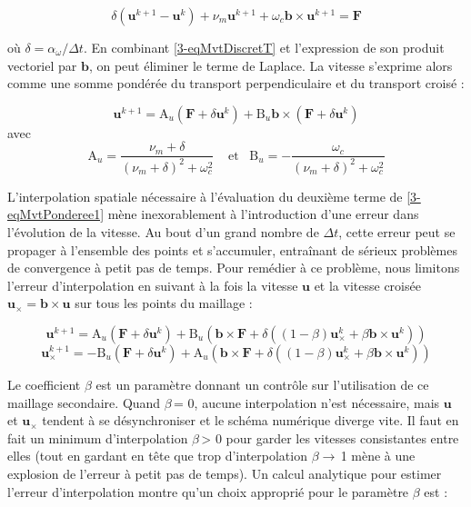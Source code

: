 \begin{refsection}
\begin{equation}
\label{3-eqMvtDiscretT}
\delta\left(\mathbf{u}^{k+1}-\mathbf{u}^{k}\right) + 
\nu_m\mathbf{u}^{k+1}+\omega_{c}\mathbf{b}\times\mathbf{u}^{k+1}=
\mathbf F
\end{equation}

où $\delta=\alpha_\omega/\Delta t$. En combinant \ref{3-eqMvtDiscretT} et
l'expression de son produit vectoriel par $\mathbf b$, on peut éliminer le
terme de Laplace. La vitesse s'exprime alors comme une somme pondérée du
transport perpendiculaire et du transport croisé :

\begin{equation}
\label{3-eqMvtPonderee1}
\mathbf{u}^{k+1}=\text{A}_u\left(\mathbf F + \delta\mathbf{u}^{k}\right)+
\text{B}_u\mathbf b\times\left(\mathbf F + \delta\mathbf{u}^{k}\right)
\end{equation}
avec 
\begin{equation}
\label{3-coefficientsVitesses}
\text{A}_u=\frac{\nu_m+\delta}{(\nu_m+\delta)^2+\omega_c^2}\;\;\;\;\text{et}\;\;\;\text{B}_u=-\frac{\omega_c}{(\nu_m+\delta)^2+\omega_c^2}
\end{equation}

L'interpolation spatiale nécessaire à l'évaluation du
deuxième terme de \eqref{3-eqMvtPonderee1} mène
inexorablement à l'introduction d'une erreur dans l'évolution de la vitesse. Au
bout d'un grand nombre de $\Delta t$, cette erreur peut se propager à
l'ensemble des points et s'accumuler, entraînant de sérieux problèmes de convergence à petit
pas de temps. Pour remédier à ce problème, nous limitons l'erreur
d'interpolation en suivant à la fois la vitesse $\mathbf u$ et la vitesse
croisée $\mathbf u_\times=\mathbf b\times\mathbf u$ sur tous les points du
maillage :

\begin{equation}
\label{3-eqMvtPonderee12}
\mathbf{u}^{k+1}=\text{A}_u\left(\mathbf F + \delta\mathbf{u}^{k}\right)+
\text{B}_u\left(\mathbf b\times\mathbf F +
\delta\left((1-\beta)\mathbf{u}_\times^{k}+\beta\mathbf
b\times\mathbf{u}^{k}\right)\right)
\end{equation}
\begin{equation}
\label{3-eqMvtPonderee2}
\mathbf{u}_\times^{k+1}=-\text{B}_u\left(\mathbf F +
\delta\mathbf{u}^{k}\right)+ \text{A}_u\left(\mathbf
b\times\mathbf F +
\delta\left((1-\beta)\mathbf{u}_\times^{k}+\beta\mathbf
b\times\mathbf{u}^{k}\right)\right)
\end{equation}

Le coefficient $\beta$ est un paramètre donnant un contrôle sur
l'utilisation de ce maillage secondaire. Quand $\beta\,$= 0, aucune
interpolation n'est nécessaire, mais $\mathbf{u}$ et $\mathbf{u}_\times$
tendent à se désynchroniser et le schéma numérique diverge vite. Il faut en
fait un minimum d'interpolation $\beta\,$> 0 pour garder les vitesses
consistantes entre elles (tout en gardant en tête que trop d'interpolation
$\beta\rightarrow\,$1 mène à une explosion de l'erreur à petit pas de temps). Un
calcul analytique pour estimer l'erreur d'interpolation montre qu'un choix approprié pour le paramètre $\beta$
est :


\end{refsection}
